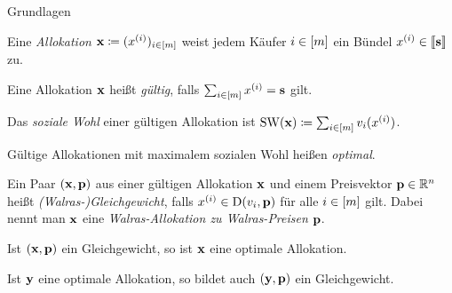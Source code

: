 \begin{frame}{Grundlagen}
	\begin{definition}[Allokation]
		Eine \emph{Allokation} $\mathbf{x}\coloneqq(x^{(i)})_{i\in\left[ m \right]}$ weist jedem Käufer $i\in\left[ m \right]$ ein Bündel $x^{(i)}\in\left\llbracket \mathbf{s} \right\rrbracket$ zu.
		\pause
		
		Eine Allokation $\mathbf{x}$ heißt \emph{gültig}, falls $\sum_{i\in\left[ m \right]}x^{(i)} = \mathbf{s}$ gilt.
		\pause 
		
		Das \emph{soziale Wohl} einer gültigen Allokation ist $\operatorname{SW}(\mathbf{x})\coloneqq \sum_{i\in\left[ m \right]} v_i(x^{(i)})$.
		
		Gültige Allokationen mit maximalem sozialen Wohl heißen \emph{optimal}.
	\end{definition}
	
	\pause
	\begin{definition}
		Ein Paar $(\mathbf{x}, \mathbf{p})$ aus einer gültigen Allokation $\mathbf{x}$ und einem Preisvektor $\mathbf{p}\in\mathbb{R}^n$ heißt \emph{(Walras-)Gleichgewicht}, falls $x^{(i)}\in\operatorname{D}(v_i, \mathbf{p})$ für alle $i\in\left[ m \right]$ gilt.
		Dabei nennt man $\mathbf{x}$ eine \emph{Walras-Allokation zu Walras-Preisen} $\mathbf{p}$.
	\end{definition}

	\pause
	\begin{lemma}[Wohlfahrtstheoreme]
		Ist $(\mathbf{x}, \mathbf{p})$ ein Gleichgewicht, so ist $\mathbf{x}$ eine optimale Allokation.
		
		Ist $\mathbf{y}$ eine optimale Allokation, so bildet auch $(\mathbf{y}, \mathbf{p})$ ein Gleichgewicht.
	\end{lemma}
\end{frame}



